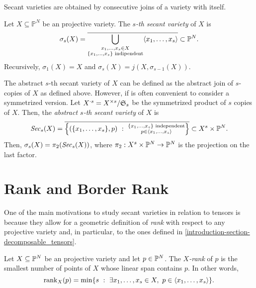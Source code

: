  Secant varieties are obtained by consecutive joins of a variety with itself.
 \begin{definition}
 \label{geometrySecants-definition-secantvariety}
 Let $X \subseteq \mathbb{P}^N$ be an projective variety. The {\it $s$-th secant variety} of $X$ is 
 \[
 \sigma_s(X) = \overline{\bigcup_{\substack{x_1,\ldots,x_s \in X \\ \{x_1,\ldots,x_s\} \text{ indipendent}}} \langle x_1,\ldots,x_s \rangle} \subset \mathbb{P}^N.
 \]
 Recursively, $\sigma_1(X) = X$ and $\sigma_s(X) = j(X,\sigma_{s-1}(X))$.
 
 The abstract $s$-th secant variety of $X$ can be defined as the abstract join of $s$-copies of $X$ as defined above. However, if is often convenient to consider a symmetrized version. Let $X^{\cdot s} = X^{\times s} / \mathfrak{S}_s$ be the symmetrized product of $s$ copies of $X$. Then, the {\it abstract $s$-th secant variety} of $X$ is 
 \[
     \mathit{Sec}_s(X) = \overline{\left\{(\{x_1,\ldots,x_s\},p) ~:~ \substack{\{x_1,\ldots,x_s\} \text{ independent} \\ p \in \langle x_1,\ldots,x_s \rangle}\right\}} \subset X^s \times \mathbb{P}^N.
 \]
 Then, $\sigma_s(X) = \pi_2(\mathit{Sec}_s(X))$, where $\pi_2 : X^s \times \mathbb{P}^N \rightarrow \mathbb{P}^N$ is the projection on the last factor.
 \end{definition}
 
 \section{Rank and Border Rank}
 \label{geometrySecants-section-rank}
 
 One of the main motivations to study secant varieties in relation to tensors is because they allow for a geometric definition of {\it rank} with respect to any projective variety and, in particular, to the ones defined in \ref{introduction-section-decomposable_tensors}.
 
 \begin{definition}
 \label{geometrySecants-definition-Xrank}
     Let $X \subseteq \mathbb{P}^N$ be an projective variety and let $p \in \mathbb{P}^N$. The \emph{$X$-rank} of $p$ is the smallest number of points of $X$ whose linear span contains $p$. In other words,
     \[
         \mathrm{rank}_X(p) = \min\{s ~:~ \exists x_1,\ldots,x_s \in X, ~ p \in \langle x_1,\ldots,x_s \rangle\}.
     \]
 \end{definition}
 
